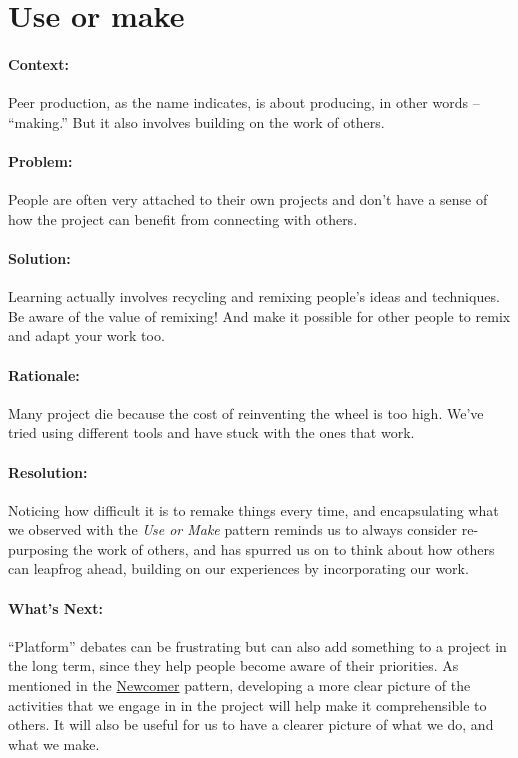 \section{Use or make}
\paragraph{Context:}
Peer production, as the name indicates, is about producing, in other words --
``making.'' But it also involves building on the work of others.

\paragraph{Problem:}
People are often very attached to their own projects and don't have a sense of how the project can benefit from connecting with others.

\paragraph{Solution:} Learning actually involves recycling and remixing people's ideas and techniques. Be aware of the value of remixing!  And make it possible for other people to remix and adapt your work too.

\paragraph{Rationale:} 
Many project die because the cost of reinventing the wheel is too high.  We've tried using different tools and have stuck with the ones that work.

\paragraph{Resolution:} Noticing how difficult it is to remake things every time, and encapsulating what we observed with the \emph{Use or Make} pattern reminds us to always consider re-purposing the work of others, and has spurred us on to think about how others can leapfrog ahead, building on our experiences by incorporating our work.

\paragraph{What's Next:} ``Platform'' debates can be frustrating but can
also add something to a project in the long term, since they help people
become aware of their priorities. As mentioned in
the \href{http://peeragogy.org/patterns/newcomer/}{Newcomer} pattern,
developing a more clear picture of the activities that we engage in in
the project will help make it comprehensible to others. It will also be
useful for us to have a clearer picture of what we do, and what we make.
